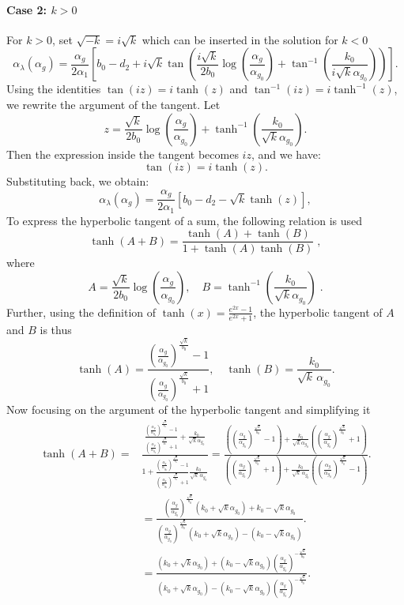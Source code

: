 \paragraph{Case 2: $k > 0$}
For $k>0$, set $\sqrt{-k} = i\sqrt{k}$ which can be inserted in the solution for $k<0$
\[
\alpha_{\lambda}(\alpha_g) = \frac{\alpha_g}{2\alpha_1} \left[ b_0 - d_2 + i\sqrt{k} \tan \left( \frac{i\sqrt{k}}{2b_0} \log \left( \frac{\alpha_g}{\alpha_{g_0}} \right) + \tan^{-1} \left( \frac{k_0}{i\sqrt{k} \alpha_{g_0}} \right) \right) \right].
\]
Using the identities \(\tan(iz) = i\tanh(z)\) and \(\tan^{-1}(iz) = i\tanh^{-1}(z)\), we rewrite the argument of the tangent. Let
\[
z = \frac{\sqrt{k}}{2b_0} \log \left( \frac{\alpha_g}{\alpha_{g_0}} \right) + \tanh^{-1} \left( \frac{k_0}{\sqrt{k} \alpha_{g_0}} \right).
\]
Then the expression inside the tangent becomes \(i z\), and we have:
\[
\tan(i z) = i\tanh(z).
\]
Substituting back, we obtain:
\[
\alpha_{\lambda}(\alpha_g) = \frac{\alpha_g}{2\alpha_1} \left[ b_0 - d_2 - \sqrt{k} \tanh(z) \right],
\]
To express the hyperbolic tangent of a sum, the following relation is used
\[
\tanh(A+B) = \frac{\tanh(A) + \tanh(B)}{1 + \tanh(A)\tanh(B)}\;,
\]
where
\[
A = \frac{\sqrt{k}}{2b_0} \log \left( \frac{\alpha_g}{\alpha_{g_0}} \right), \quad 
B = \tanh^{-1} \left( \frac{k_0}{\sqrt{k}\alpha_{g_0}} \right)\;.
\]
Further, using the definition of $\tanh\left(x\right)=\frac{e^{2x}-1}{e^{2x}+1}$, the hyperbolic tangent of $A$ and $B$ is thus
\[
\tanh(A) = \frac{ \left( \frac{\alpha_g}{\alpha_{g_0}} \right)^{\frac{\sqrt{k}}{b_0}} - 1 }{ \left(  \frac{\alpha_g}{\alpha_{g_0}}\right)^{\frac{\sqrt{k}}{b_0}} + 1 }, \quad 
\tanh(B) = \frac{k_0}{\sqrt{k} \, \alpha_{g_0}}.
\]
Now focusing on the argument of the hyperbolic tangent and simplifying it
\begin{align*}
    \tanh(A+B)=&\frac{ \frac{ \left( \frac{\alpha_g}{\alpha_{g_0}}\right)^{\frac{\sqrt{k}}{b_0}} - 1 }{ \left(\frac{\alpha_g}{\alpha_{g_0}} \right)^{\frac{\sqrt{k}}{b_0}} + 1 } + \frac{k_0}{\sqrt{k} \alpha_{g_0}} }{ 1 +\frac{ \left( \frac{\alpha_g}{\alpha_{g_0}} \right)^{\frac{\sqrt{k}}{b_0}} - 1 }{ \left(\frac{\alpha_g}{\alpha_{g_0}} \right)^{\frac{\sqrt{k}}{b_0}} + 1 }  \frac{k_0}{\sqrt{k} \, \alpha_{g_0}} }
    = \frac{
  \left( \left( \frac{\alpha_g}{\alpha_{g_0}}  \right)^{\frac{\sqrt{k}}{b_0}} - 1 \right) 
  + \frac{k_0}{\sqrt{k}\alpha_{g_0}} \left( \left( \frac{\alpha_g}{\alpha_{g_0}} \right)^{\frac{\sqrt{k}}{b_0}} + 1 \right)
}{
  \left( \left( \frac{\alpha_g}{\alpha_{g_0}}  \right)^{\frac{\sqrt{k}}{b_0}} + 1 \right) 
  + \frac{k_0}{\sqrt{k} \, \alpha_{g_0}} \left( \left( \frac{\alpha_g}{\alpha_{g_0}}  \right)^{\frac{\sqrt{k}}{b_0}} - 1 \right)
}.\\&=  \frac{
  \left(  \frac{\alpha_g}{\alpha_{g_0}}  \right)^{\frac{\sqrt{k}}{b_0}} (k_0+\sqrt{k}\alpha_{g_0})+k_0- \sqrt{k}\alpha_{g_0} 
}{
  \left(  \frac{\alpha_g}{\alpha_{g_0}}  \right)^{\frac{\sqrt{k}}{b_0}} (k_0+\sqrt{k}\alpha_{g_0})-(k_0- \sqrt{k}\alpha_{g_0} )
}.
\\&=  \frac{
   (k_0+\sqrt{k}\alpha_{g_0})+(k_0- \sqrt{k}\alpha_{g_0})\left(  \frac{\alpha_g}{\alpha_{g_0}}  \right)^{-\frac{\sqrt{k}}{b_0}}
}{
  (k_0+\sqrt{k}\alpha_{g_0})-(k_0- \sqrt{k}\alpha_{g_0} )\left(  \frac{\alpha_g}{\alpha_{g_0}}  \right)^{-\frac{\sqrt{k}}{b_0}} 
}.
\end{align*}
